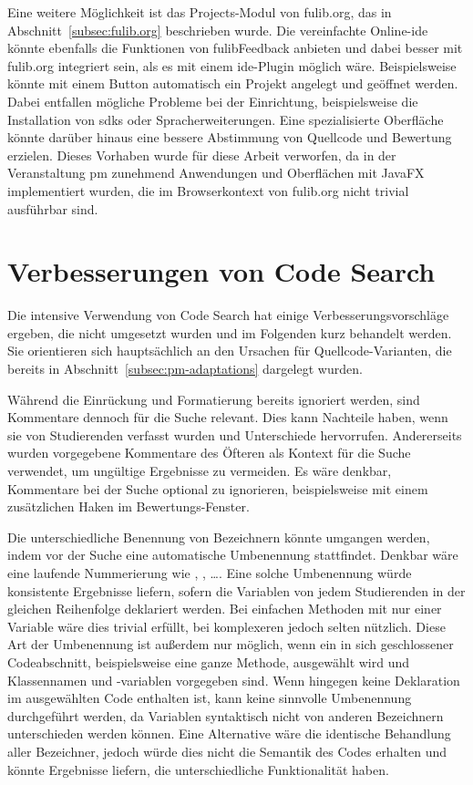 Eine weitere Möglichkeit ist das Projects-Modul von fulib.org, das in Abschnitt~\ref{subsec:fulib.org} beschrieben wurde.
Die vereinfachte Online-\ac{ide} könnte ebenfalls die Funktionen von fulibFeedback anbieten und dabei besser mit fulib.org integriert sein, als es mit einem \ac{ide}-Plugin möglich wäre.
Beispielsweise könnte mit einem Button automatisch ein Projekt angelegt und geöffnet werden.
Dabei entfallen mögliche Probleme bei der Einrichtung, beispielsweise die Installation von \acp{sdk} oder Spracherweiterungen.
Eine spezialisierte Oberfläche könnte darüber hinaus eine bessere Abstimmung von Quellcode und Bewertung erzielen.
Dieses Vorhaben wurde für diese Arbeit verworfen, da in der Veranstaltung \ac{pm} zunehmend Anwendungen und Oberflächen mit JavaFX implementiert wurden, die im Browserkontext von fulib.org nicht trivial ausführbar sind.

\section{Verbesserungen von Code Search}\label{sec:code-search-improvements}

Die intensive Verwendung von Code Search hat einige Verbesserungsvorschläge ergeben, die nicht umgesetzt wurden und im Folgenden kurz behandelt werden.
Sie orientieren sich hauptsächlich an den Ursachen für Quellcode-Varianten, die bereits in Abschnitt~\ref{subsec:pm-adaptations} dargelegt wurden.

Während die Einrückung und Formatierung bereits ignoriert werden, sind Kommentare dennoch für die Suche relevant.
Dies kann Nachteile haben, wenn sie von Studierenden verfasst wurden und Unterschiede hervorrufen.
Andererseits wurden vorgegebene Kommentare des Öfteren als Kontext für die Suche verwendet, um ungültige Ergebnisse zu vermeiden.
Es wäre denkbar, Kommentare bei der Suche optional zu ignorieren, beispielsweise mit einem zusätzlichen Haken im Bewertungs-Fenster.

Die unterschiedliche Benennung von Bezeichnern könnte umgangen werden, indem vor der Suche eine automatische Umbenennung stattfindet.
Denkbar wäre eine laufende Nummerierung wie , , \ldots.
Eine solche Umbenennung würde konsistente Ergebnisse liefern, sofern die Variablen von jedem Studierenden in der gleichen Reihenfolge deklariert werden.
Bei einfachen Methoden mit nur einer Variable wäre dies trivial erfüllt, bei komplexeren jedoch selten nützlich.
Diese Art der Umbenennung ist außerdem nur möglich, wenn ein in sich geschlossener Codeabschnitt, beispielsweise eine ganze Methode, ausgewählt wird und Klassennamen und -variablen vorgegeben sind.
Wenn hingegen keine Deklaration im ausgewählten Code enthalten ist, kann keine sinnvolle Umbenennung durchgeführt werden, da Variablen syntaktisch nicht von anderen Bezeichnern unterschieden werden können.
Eine Alternative wäre die identische Behandlung aller Bezeichner, jedoch würde dies nicht die Semantik des Codes erhalten und könnte Ergebnisse liefern, die unterschiedliche Funktionalität haben.

